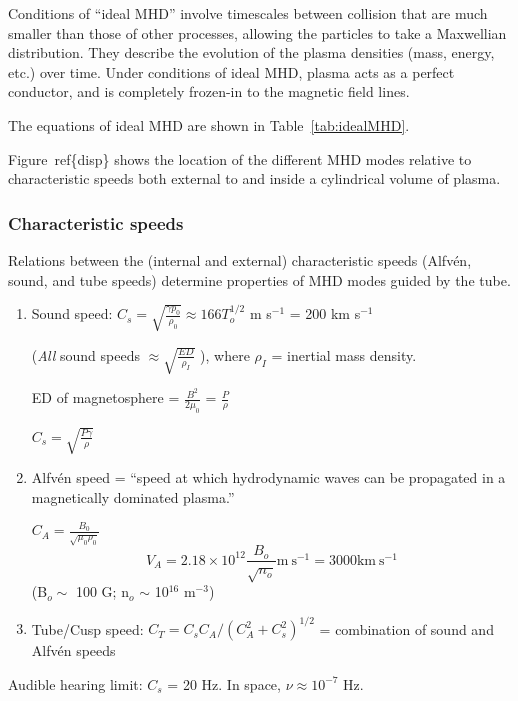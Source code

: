 
Conditions of ``ideal MHD'' involve timescales between collision that are much
smaller than those of other processes, allowing the particles to take a
Maxwellian distribution. They describe the evolution of the plasma densities
(mass, energy, etc.) over time. Under conditions of ideal MHD, plasma acts as a
perfect conductor, and is completely frozen-in to the magnetic field lines.

The equations of ideal MHD are shown in
Table~\ref{tab:idealMHD}.







Figure~ref\{disp\} shows the location of the different MHD modes relative to
characteristic speeds both external to and inside a cylindrical volume of
plasma.

\subsubsection{Characteristic speeds}
Relations between the (internal and external)
characteristic speeds (Alfv\'en, sound, and tube speeds)
determine properties of MHD modes guided by the tube.

\begin{enumerate}
    \item Sound speed: $C_{s} = \sqrt{\frac{\gamma p_{0}}{\rho_{0}}}
            \approx 166 T_{o}^{1/2}$ m s$^{-1}$ = 200 km s$^{-1}$

            (\emph{All} sound speeds $\approx \sqrt{ \frac{ED}{\rho_{I}} } $ ),
            where $\rho_{I}$ = inertial mass density.

            ED of magnetosphere = $\frac{B^{2}}{2\mu_{0}} $
            = $\frac{P}{\rho} $

            $C_{s} = \sqrt{ \frac{P\gamma}{\rho}  } $

    \item Alfv\'en speed = ``speed at which hydrodynamic waves can be propagated
    in a magnetically dominated plasma.''

        $C_{A} = \frac{B_{0}}{\sqrt{\mu_{0}\rho_{0}}}$
        \[
            V_{A} = 2.18\times10^{12}\frac{B_o}{\sqrt{n_o}}
            \textrm{m}\ \textrm{s}^{-1} = 3000 \textrm{km}\ \textrm{s}^{-1}
            \]
        (B$_{o} \sim$ 100 G; n$_{o}$ $\sim$ 10$^{16}$ m$^{-3}$)
    \item Tube/Cusp speed:
        $C_{T} = C_{s}C_{A}/\left(C_{A}^{2} + C_{s}^{2}\right)^{1/2}$
        = combination of sound and Alfv\'en speeds
\end{enumerate}
Audible hearing limit: $C_{s}$ = 20 Hz. In space, $\nu \approx 10^{-7}$ Hz.


